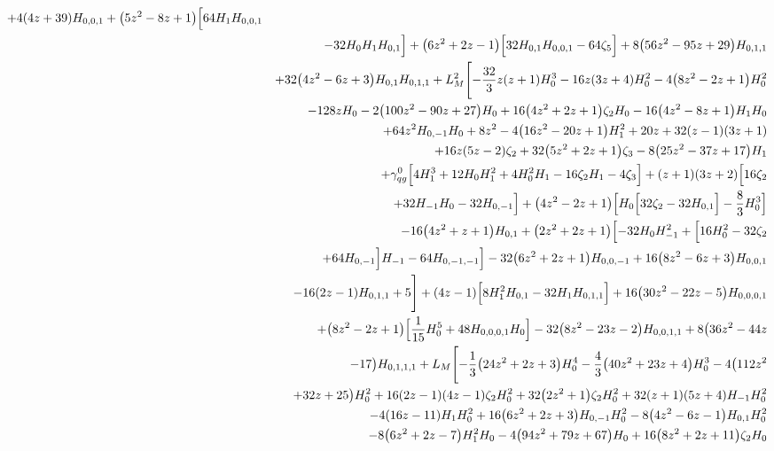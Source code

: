 \begin{eqnarray}
+4 (4 z+39) H_{0,0,1}+\big(5 z^2-8 z+1\big) \Bigl[64 H_1H_{0,0,1}
\nonumber \\ &&
-32 H_0 H_1 H_{0,1}\Bigr]+\big(6 z^2+2 z-1\big) \Bigl[32 H_{0,1}H_{0,0,1}-64 \zeta_5\Bigr]+8 \big(56 z^2-95 z+29\big) H_{0,1,1}
\nonumber \\ &&
+32 \big(4z^2-6 z+3\big) H_{0,1} H_{0,1,1}
+L_M^2 \Biggl[-\frac{32}{3}  z (z+1) H_0^3-16 z (3 z+4) H_0^2-4 \big(8 z^2-2 z+1\big) H_0^2
\nonumber \\ &&
-128  z H_0
-2\big(100 z^2-90 z+27\big) H_0+16  \big(4 z^2+2 z+1\big) \zeta_2H_0-16 \big(4 z^2-8 z+1\big) H_1 H_0
\nonumber \\ &&
+64  z^2 H_{0,-1} H_0
+8 z^2-4\big(16 z^2-20 z+1\big) H_1^2+20 z+32  (z-1) (3 z+1)
\nonumber \\ &&
+16 z (5 z-2)\zeta_2+32  \big(5 z^2+2 z+1\big) \zeta_3-8 \big(25 z^2-37z+17\big) H_1
\nonumber \\ &&
+{\gamma}_{qg}^{0} \Bigl[4 H_1^3+12 H_0 H_1^2+4 H_0^2 H_1-16\zeta_2 H_1-4 \zeta_3\Bigr]+(z+1) (3 z+2) \Bigl[16  \zeta_2
\nonumber \\ &&
+32  H_{-1} H_0-32  H_{0,-1}\Bigr]+\big(4 z^2-2 z+1\big) \Bigl[H_0\Bigl[32 \zeta_2-32 H_{0,1}\Bigr]-\frac{8}{3} H_0^3\Bigr]
\nonumber \\ &&
-16 \big(4z^2+z+1\big) H_{0,1}+\big(2 z^2+2 z+1\big) \Bigl[-32  H_0H_{-1}^2+\Bigl[16  H_0^2-32  \zeta_2
\nonumber \\ &&
+64  H_{0,-1}\Bigr]H_{-1}-64  H_{0,-1,-1}\Bigr]-32  \big(6 z^2+2 z+1\big)H_{0,0,-1}+16 \big(8 z^2-6 z+3\big) H_{0,0,1}
\nonumber \\ &&
-16 (2 z-1) H_{0,1,1}+5\Biggr]
+(4z-1) \Bigl[8 H_1^2 H_{0,1}-32 H_1 H_{0,1,1}\Bigr]+16 \big(30 z^2-22 z-5\big)H_{0,0,0,1}
\nonumber \\ &&
+\big(8 z^2-2 z+1\big) \Bigl[\frac{1}{15} H_0^5+48 H_{0,0,0,1}H_0\Bigr]
-32 \big(8 z^2-23 z-2\big) H_{0,0,1,1}
+8 \big(36 z^2-44 z
\nonumber \\ && 
-17\big)H_{0,1,1,1}
+L_M \Biggl[-\frac{1}{3} \big(24 z^2+2 z+3\big)H_0^4-\frac{4}{3} \big(40 z^2+23 z+4\big) H_0^3-4 
\big(112 z^2
\nonumber \\ &&
+32 z+25\big)H_0^2
+16 (2 z-1) (4 z-1) \zeta_2 H_0^2+32  \big(2 z^2+1\big)\zeta_2 H_0^2+32  (z+1) (5 z+4) H_{-1} H_0^2
\nonumber \\ &&
-4 (16 z-11) H_1H_0^2+16  \big(6 z^2+2 z+3\big) H_{0,-1} H_0^2-8 \big(4 z^2-6 z-1\big)H_{0,1} H_0^2
\nonumber \\ &&
-8 \big(6 z^2+2 z-7\big) H_1^2 H_0-4 \big(94 z^2+79 z+67\big)H_0+16  \big(8 z^2+2 z+11\big) \zeta_2 H_0

\end{eqnarray}
